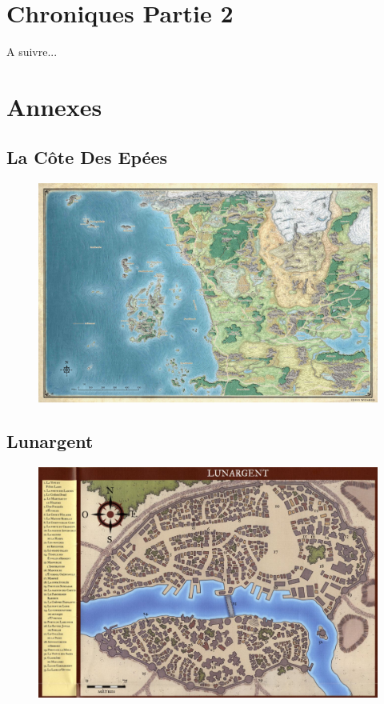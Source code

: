 \documentclass[10pt,a4paper,twoside,twocolumn,openany]{book}
\begin{document}
\chapter{Chroniques Partie 2}

A suivre...

\onecolumn
\chapter{Annexes}

\section{La Côte Des Epées} 

\begin{figure}[!h]
\centering
\includegraphics[width=\textwidth,keepaspectratio]{soc.jpg}
\end{figure}

\newpage

\section{Lunargent}

\begin{figure}[!h]
\centering
\includegraphics[width=\textwidth,keepaspectratio]{Map_Lunargent.jpg}
\end{figure}
\end{document}
